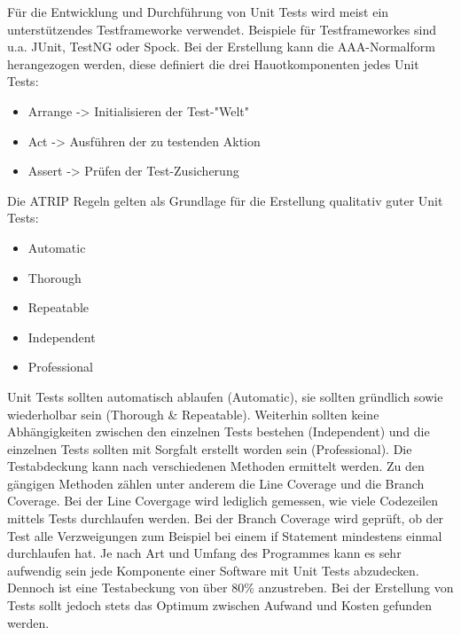 Für die Entwicklung und Durchführung von Unit Tests wird meist ein unterstützendes Testframeworke verwendet. Beispiele für Testframeworkes sind u.a. JUnit, TestNG oder Spock.\newpage
Bei der Erstellung kann die AAA-Normalform herangezogen werden, diese definiert die drei Hauotkomponenten jedes Unit Tests\cite{DanielLindner.2020}:
\begin{itemize}
	\item Arrange -> Initialisieren der Test-"Welt"
	\item Act -> Ausführen der zu testenden Aktion
	\item Assert -> Prüfen der Test-Zusicherung
\end{itemize}
Die ATRIP Regeln gelten als Grundlage für die Erstellung qualitativ guter Unit Tests\cite{DanielLindner.2020}:
\begin{itemize}
	\item Automatic
	\item Thorough
	\item Repeatable
	\item Independent
	\item Professional
\end{itemize}
Unit Tests sollten automatisch ablaufen (Automatic), sie sollten gründlich sowie wiederholbar sein (Thorough \& Repeatable). Weiterhin sollten keine Abhängigkeiten zwischen den einzelnen Tests bestehen (Independent) und die einzelnen Tests sollten mit Sorgfalt erstellt worden sein (Professional).
Die Testabdeckung kann nach verschiedenen Methoden ermittelt werden. Zu den gängigen Methoden zählen unter anderem die Line Coverage und die Branch Coverage. Bei der Line Covergage wird lediglich gemessen, wie viele Codezeilen mittels Tests durchlaufen werden. Bei der Branch Coverage wird geprüft, ob der Test alle Verzweigungen zum Beispiel bei einem if Statement mindestens einmal durchlaufen hat.\cite{Grunfelder.2017}
Je nach Art und Umfang des Programmes kann es sehr aufwendig sein jede Komponente einer Software mit Unit Tests abzudecken. Dennoch ist eine Testabeckung von über 80\% anzustreben. Bei der Erstellung von Tests sollt jedoch stets das Optimum zwischen Aufwand und Kosten gefunden werden.\cite{DanielLindner.2020}
\newpage
